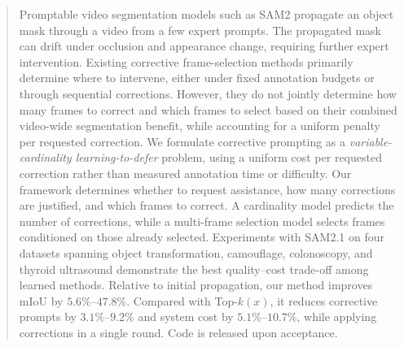 \begin{abstract}
Promptable video segmentation models such as SAM2 propagate
an object mask through a video from a few expert prompts.
The propagated mask can drift under occlusion and appearance
change, requiring further expert intervention.
Existing corrective frame-selection methods primarily determine where to intervene, either under fixed annotation budgets or through sequential corrections. However, they do not jointly determine how many frames to correct and which frames to select based on their combined video-wide segmentation benefit, while accounting for a uniform penalty per requested correction.
We formulate corrective prompting as a
\textit{variable-cardinality learning-to-defer} problem,
using a uniform cost per requested correction rather than
measured annotation time or difficulty.
Our framework determines whether to request assistance,
how many corrections are justified, and which frames to
correct. A cardinality model predicts the number of
corrections, while a multi-frame selection model selects
frames conditioned on those already selected.
Experiments with SAM2.1 on four datasets spanning object
transformation, camouflage, colonoscopy, and thyroid
ultrasound demonstrate the best quality--cost trade-off
among learned methods.
Relative to initial propagation, our method improves mIoU
by $5.6\%$--$47.8\%$.
Compared with Top-$k(x)$, it reduces corrective prompts
by $3.1\%$--$9.2\%$ and system cost by $5.1\%$--$10.7\%$,
while applying corrections in a single round.
Code is released upon acceptance.
\end{abstract}